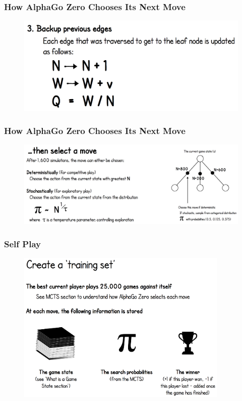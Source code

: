 \documentclass[notheorems, aspectratio=54]{beamer}
\begin{document}
\begin{frame}
    \frametitle{How AlphaGo Zero Chooses Its Next Move}

    \begin{figure}
        \includegraphics[height=0.5\textheight]{fig/alpha_mcts3.png}
    \end{figure}
\end{frame}

\begin{frame}
    \frametitle{How AlphaGo Zero Chooses Its Next Move}

    \begin{figure}
        \includegraphics[width=\textwidth]{fig/alpha_mcts4.png}
    \end{figure}
\end{frame}

\begin{frame}
    \frametitle{Self Play}

    \begin{figure}
        \includegraphics[width=0.9\textwidth]{fig/self_play.png}
    \end{figure}
\end{frame}
\end{document}
